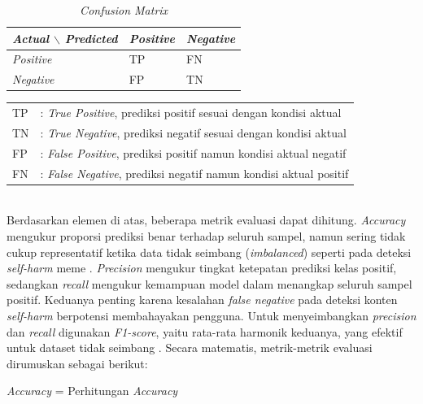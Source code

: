 \begin{table}[H]
	\centering
	\caption{\textit{Confusion Matrix}}
	\label{table:confmatrix}
	\small
	\setlength{\tabcolsep}{4pt}
	\renewcommand{\arraystretch}{1.2}
	\begin{tabular}{>{\centering\arraybackslash}m{2.6cm} >{\centering\arraybackslash}m{1.5cm} >{\centering\arraybackslash}m{1.5cm}}
		\hline
		\textbf{\textit{Actual $\backslash$ Predicted}} & \textbf{\textit{Positive}} & \textbf{\textit{Negative}} \\
		\hline
		\textit{Positive} & TP & FN \\
		\textit{Negative} & FP & TN \\
		\hline
	\end{tabular}
\end{table}

\noindent
{}

\begin{tabular}{l l}
TP & : \textit{True Positive}, prediksi positif sesuai dengan kondisi aktual \\ 
TN & : \textit{True Negative}, prediksi negatif sesuai dengan kondisi aktual \\ 
FP & : \textit{False Positive}, prediksi positif namun kondisi aktual negatif \\ 
FN & : \textit{False Negative}, prediksi negatif namun kondisi aktual positif \\ 
\end{tabular} \\

Berdasarkan elemen di atas, beberapa metrik evaluasi dapat dihitung. 
\textit{Accuracy} mengukur proporsi prediksi benar terhadap seluruh sampel, 
namun sering tidak cukup representatif ketika data tidak seimbang 
(\textit{imbalanced}) seperti pada deteksi \textit{self-harm} meme \cite{sokolova2009systematic}. \textit{Precision} mengukur tingkat ketepatan prediksi kelas positif, sedangkan 
\textit{recall} mengukur kemampuan model dalam menangkap seluruh sampel positif. 
Keduanya penting karena kesalahan \textit{false negative} pada deteksi 
konten \textit{self-harm} berpotensi membahayakan pengguna. 
Untuk menyeimbangkan \textit{precision} dan \textit{recall} digunakan \textit{F1-score}, yaitu 
rata-rata harmonik keduanya, yang efektif untuk dataset tidak seimbang 
\cite{powers2020evaluationprecisionrecallfmeasure}. Secara matematis, metrik-metrik evaluasi dirumuskan sebagai berikut:

\begin{equationcaptioned}[eq:accuracy]{
\textit{Accuracy} = 
}{
Perhitungan \textit{Accuracy}
}
\end{equationcaptioned}

